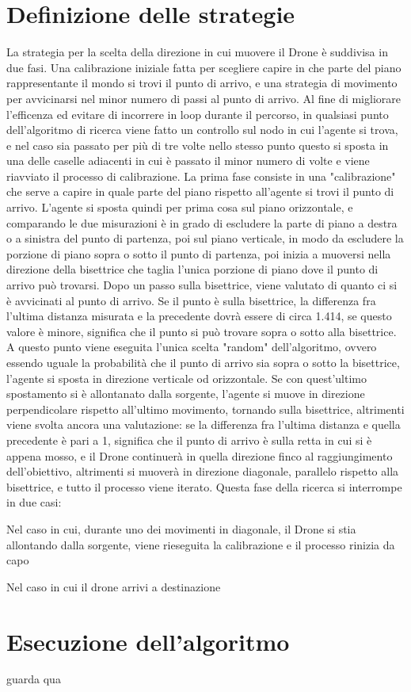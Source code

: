 \section{Definizione delle strategie}
La strategia per la scelta della direzione in cui muovere il Drone è suddivisa in due fasi. Una calibrazione iniziale fatta per scegliere capire in che parte del piano rappresentante il mondo si trovi il punto di arrivo, e una strategia di movimento per avvicinarsi nel minor numero di passi al punto di arrivo. Al fine di migliorare l'efficenza ed evitare di incorrere in loop durante il percorso, in qualsiasi punto dell'algoritmo di ricerca viene fatto un controllo sul nodo in cui l'agente si trova, e nel caso sia passato per più di tre volte nello stesso punto questo si sposta in una delle caselle adiacenti in cui è passato il minor numero di volte e viene riavviato il processo di calibrazione.
La prima fase consiste in una "calibrazione" che serve a capire in quale parte del piano rispetto all'agente si trovi il punto di arrivo. L'agente si sposta quindi per prima cosa sul piano orizzontale, e comparando le due misurazioni è in grado di escludere la parte di piano a destra o a sinistra del punto di partenza, poi sul piano verticale, in modo da escludere la porzione di piano sopra o sotto il punto di partenza, poi inizia a muoversi nella direzione della bisettrice che taglia l'unica porzione di piano dove il punto di arrivo può trovarsi. Dopo un passo sulla bisettrice, viene valutato di quanto ci si è avvicinati al punto di arrivo. Se il punto è sulla bisettrice, la differenza fra l'ultima distanza misurata e la precedente dovrà essere di circa 1.414, se questo valore è minore, significa che il punto si può trovare sopra o sotto alla bisettrice. A questo punto viene eseguita l'unica scelta "random" dell'algoritmo, ovvero essendo uguale la probabilità che il punto di arrivo sia sopra o sotto la bisettrice, l'agente si sposta in direzione verticale od orizzontale. Se con quest'ultimo spostamento si è allontanato dalla sorgente, l'agente si muove in direzione perpendicolare rispetto all'ultimo movimento, tornando sulla bisettrice, altrimenti viene svolta ancora una valutazione: se la differenza fra l'ultima distanza e quella precedente è pari a 1, significa che il punto di arrivo è sulla retta in cui si è appena mosso, e il Drone continuerà in quella direzione finco al raggiungimento dell'obiettivo, altrimenti si muoverà in direzione diagonale, parallelo rispetto alla bisettrice, e tutto il processo viene iterato. Questa fase della ricerca si interrompe in due casi: 

Nel caso in cui, durante uno dei movimenti in diagonale, il Drone si stia allontando dalla sorgente, viene rieseguita la calibrazione e il processo rinizia da capo

Nel caso in cui il drone arrivi a destinazione
	
\section{Esecuzione dell'algoritmo}
	guarda qua